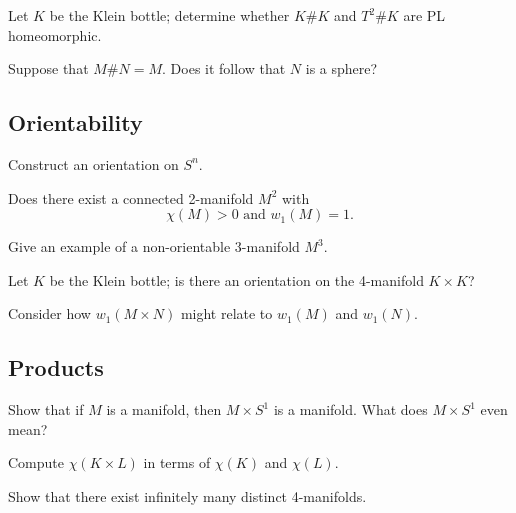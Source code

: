 \documentclass[12pt]{pset}
\begin{document}
\begin{problem}
 Let $K$ be the Klein bottle; determine whether $K \# K$ and $T^2 \#
 K$ are PL homeomorphic.
\end{problem}

\begin{problem}[Hard]
  Suppose that $M \# N = M$.  Does it follow that $N$ is a sphere?
\end{problem}


\subsection*{Orientability}

\begin{requiredproblem}
  Construct an orientation on $S^n$.
\end{requiredproblem}

\begin{problem}
  Does there exist a connected 2-manifold $M^2$ with
  $$\chi(M) > 0 \mbox{ and } w_1(M) = 1. $$
\end{problem}

\begin{problem}
  Give an example of a non-orientable $3$-manifold $M^3$.
\end{problem}

\begin{problem}
  Let $K$ be the Klein bottle; is there an orientation on the
  4-manifold $K \times K$?
\end{problem}

\begin{problem}
  Consider how $w_1(M \times N)$ might relate to $w_1(M)$ and
  $w_1(N)$.
\end{problem}


\subsection*{Products}

\begin{problem}
  Show that if $M$ is a manifold, then $M \times S^1$ is a manifold.  What does $M \times S^1$ even mean?
\end{problem}

\begin{problem}
  Compute $\chi(K \times L)$ in terms of $\chi(K)$ and $\chi(L)$.
\end{problem}

\begin{problem}
  Show that there exist infinitely many distinct 4-manifolds.
\end{problem}
\end{document}

